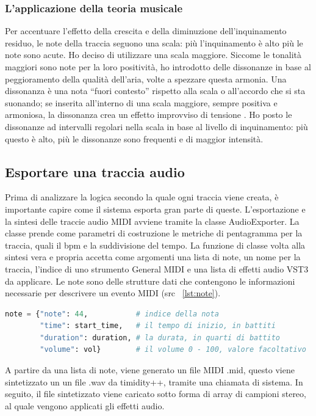 \subsubsection{L'applicazione della teoria musicale}
Per accentuare l'effetto della crescita e della diminuzione dell'inquinamento residuo, le note della traccia seguono una scala: più l'inquinamento è alto più le note sono acute.
Ho deciso di utilizzare una scala maggiore. Siccome le tonalità maggiori sono note per la loro positività, ho introdotto delle dissonanze in base al peggioramento della qualità dell'aria, volte a spezzare questa armonia.
Una dissonanza è una nota “fuori contesto” rispetto alla scala o all'accordo che si sta suonando; se inserita all'interno di una scala maggiore, sempre positiva e armoniosa, la dissonanza crea un effetto improvviso di tensione \cite{dissonance}.
Ho posto le dissonanze ad intervalli regolari nella scala in base al livello di inquinamento: più questo è alto, più le dissonanze sono frequenti e di maggior intensità.




\subsection{Esportare una traccia audio}
Prima di analizzare la logica secondo la quale ogni traccia viene creata, è importante capire come il sistema esporta gran parte di queste.
L'esportazione e la sintesi delle traccie audio MIDI avviene tramite la classe AudioExporter.
La classe prende come parametri di costruzione le metriche di pentagramma per la traccia, quali il bpm e la suddivisione del tempo.
La funzione di classe volta alla sintesi vera e propria accetta come argomenti una lista di note, un nome per la traccia, l'indice di uno strumento General MIDI e una lista di effetti audio VST3 da applicare.
Le note sono delle strutture dati che contengono le informazioni necessarie per descrivere un evento MIDI (src ~\ref{lst:note}).
\label{lst:note}
\begin{lstlisting}[language=Python]
note = {"note": 44,           # indice della nota
        "time": start_time,   # il tempo di inizio, in battiti 
        "duration": duration, # la durata, in quarti di battito
        "volume": vol}        # il volume 0 - 100, valore facoltativo
\end{lstlisting}
A partire da una lista di note, viene generato un file MIDI .mid, questo viene sintetizzato un un file .wav da timidity++, tramite una chiamata di sistema.
In seguito, il file sintetizzato viene caricato sotto forma di array di campioni stereo, al quale vengono applicati gli effetti audio.



